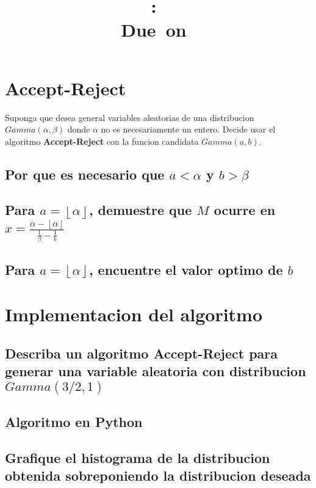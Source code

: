 \documentclass{article}
\title{
	\vspace{2in}
	\textmd{\textbf{\hmwkClass:\ \hmwkTitle}}\\
	\normalsize\vspace{0.1in}\small{Due\ on\ \hmwkDueDate}\\
	\vspace{0.1in}\large{\textit{\hmwkClassInstructor}}
	\vspace{3in}
}
\author{\hmwkAuthorName}
\date{}
\begin{document}
\maketitle
\pagebreak
\tableofcontents
\pagebreak

\section{Accept-Reject}
Suponga que desea general variables aleatorias de una distribucion $Gamma(\alpha, \beta)$ donde
$\alpha$ no es necesariamente un entero. Decide usar el algoritmo \textbf{Accept-Reject} con la funcion candidata $Gamma(a,b)$.

\subsection{Por que es necesario que $a < \alpha$ y $b> \beta$}

\subsection{Para $a = \left\lfloor \alpha \right\rfloor$, demuestre que $M$ ocurre en $x = \frac{\alpha - \left\lfloor \alpha \right\rfloor}{\frac{1}{\beta} - \frac{1}{b}}$}

\subsection{Para $a = \left\lfloor \alpha \right\rfloor$, encuentre el valor optimo de $b$}

\section{Implementacion del algoritmo}

\subsection{Describa un algoritmo \textbf{Accept-Reject} para generar una variable aleatoria con distribucion $Gamma(3/2,1)$}


\subsection{Algoritmo en Python}
\subsection{Grafique el histograma de la distribucion obtenida sobreponiendo la distribucion deseada}
\end{document}
